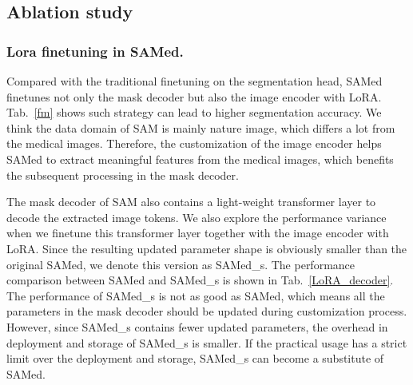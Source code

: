 \documentclass[runningheads]{llncs}
\begin{document}
\subsection{Ablation study}
\subsubsection{Lora finetuning in SAMed.} Compared with the traditional finetuning on the segmentation head, SAMed finetunes not only the mask decoder but also the image encoder with LoRA. Tab.~\ref{fm} shows such strategy can lead to higher segmentation accuracy. We think the data domain of SAM is mainly nature image, which differs a lot from the medical images. Therefore, the customization of the image encoder helps SAMed to extract meaningful features from the medical images, which benefits the subsequent processing in the mask decoder.

\begin{table*}[t!]
\centering
\caption{Ablation study on finetuning method of SAMed (The embedding in prompt encoder is finetuned by default).}
\footnotesize
{}
\label{fm}
\end{table*}

The mask decoder of SAM also contains a light-weight transformer layer to decode the extracted image tokens. We also explore the performance variance when we finetune this transformer layer together with the image encoder with LoRA. Since the resulting updated parameter shape is obviously smaller than the original SAMed, we denote this version as SAMed\_s. The performance comparison between SAMed and SAMed\_s is shown in Tab.~\ref{LoRA_decoder}. The performance of SAMed\_s is not as good as SAMed, which means all the parameters in the mask decoder should be updated during customization process. However, since SAMed\_s contains fewer updated parameters, the overhead in deployment and storage of SAMed\_s is smaller. If the practical usage has a strict limit over the deployment and storage, SAMed\_s can become a substitute of SAMed.
\end{document}
